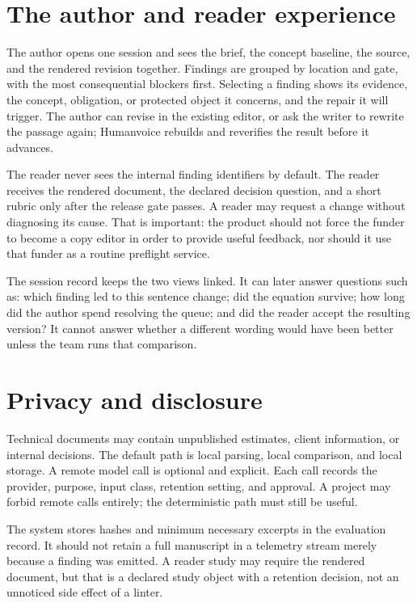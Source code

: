 \section{The author and reader experience}

The author opens one session and sees the brief, the concept baseline, the source,
and the rendered revision together. Findings are grouped by location and gate,
with the most consequential blockers first. Selecting a finding shows its
evidence, the concept, obligation, or protected object it concerns, and the repair
it will trigger. The author can revise in the existing editor, or ask the writer
to rewrite the passage again; Humanvoice rebuilds and reverifies the result before
it advances.

The reader never sees the internal finding identifiers by default. The reader
receives the rendered document, the declared decision question, and a short
rubric only after the release gate passes. A reader may request a change without
diagnosing its cause. That is important: the product should not force the
funder to become a copy editor in order to provide useful feedback, nor should
it use that funder as a routine preflight service.

The session record keeps the two views linked. It can later answer questions
such as: which finding led to this sentence change; did the equation survive;
how long did the author spend resolving the queue; and did the reader accept
the resulting version? It cannot answer whether a different wording would have
been better unless the team runs that comparison.

\section{Privacy and disclosure}

Technical documents may contain unpublished estimates, client information, or
internal decisions. The default path is local parsing, local comparison, and
local storage. A remote model call is optional and explicit. Each call records
the provider, purpose, input class, retention setting, and approval. A
project may forbid remote calls entirely; the deterministic path must still be
useful.

The system stores hashes and minimum necessary excerpts in the evaluation
record. It should not retain a full manuscript in a telemetry stream merely
because a finding was emitted. A reader study may require the rendered
document, but that is a declared study object with a retention decision, not an
unnoticed side effect of a linter.

